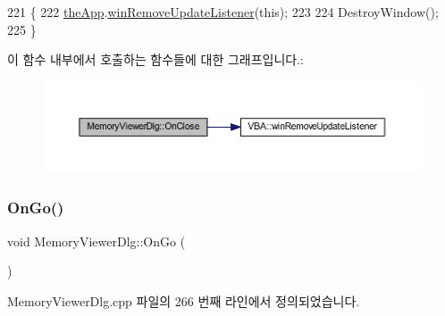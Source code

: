 \begin{DoxyCode}
221 \{
222   \mbox{\hyperlink{_v_b_a_8cpp_a8095a9d06b37a7efe3723f3218ad8fb3}{theApp}}.\mbox{\hyperlink{class_v_b_a_a2d31a0656df2230310aa8dc9e3a735d3}{winRemoveUpdateListener}}(\textcolor{keyword}{this});
223   
224   DestroyWindow();
225 \}
\end{DoxyCode}
이 함수 내부에서 호출하는 함수들에 대한 그래프입니다.\+:
\nopagebreak
\begin{figure}[H]
\begin{center}
\leavevmode
\includegraphics[width=350pt]{class_memory_viewer_dlg_a49522f159a0ccbca8c511e5c248b9b93_cgraph}
\end{center}
\end{figure}
\mbox{\label{class_memory_viewer_dlg_aa21f28b3490b179e79e3a3687fef0c45}} 
\subsubsection{\texorpdfstring{On\+Go()}{OnGo()}}
{\footnotesize\ttfamily void Memory\+Viewer\+Dlg\+::\+On\+Go (\begin{DoxyParamCaption}{ }\end{DoxyParamCaption})\hspace{0.3cm}{\ttfamily [protected]}}



Memory\+Viewer\+Dlg.\+cpp 파일의 266 번째 라인에서 정의되었습니다.


